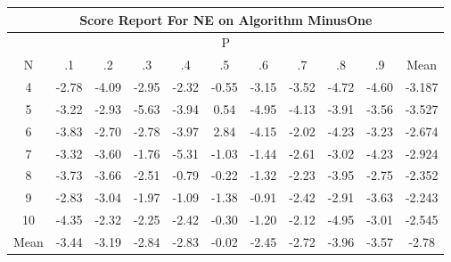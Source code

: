 \documentclass[11pt,a4paper]{report}
\begin{document}
\begin{longtable}{ | c || c | c | c | c | c | c | c | c | c || c |}
\hline
\multicolumn{11}{|c|}{ Score Report For NE on Algorithm MinusOne} \\
\hline
\multicolumn{11}{|c|}{ P } \\
\hline
N & .1 & .2 & .3 & .4 & .5 & .6 & .7 & .8 & .9 & Mean\\
 \hline
 \hline
 \endhead
  4 &  \cellcolor[HTML]{FFB7B7} -2.78 &  \cellcolor[HTML]{FF9797} -4.09 &  \cellcolor[HTML]{FFB7B7} -2.95 &  \cellcolor[HTML]{FFC7C7} -2.32 &  \cellcolor[HTML]{FFEFEF} -0.55 &  \cellcolor[HTML]{FFAFAF} -3.15 &  \cellcolor[HTML]{FFA7A7} -3.52 &  \cellcolor[HTML]{FF8787} -4.72 &  \cellcolor[HTML]{FF8F8F} -4.60 & -3.187 \\
  5 &  \cellcolor[HTML]{FFAFAF} -3.22 &  \cellcolor[HTML]{FFB7B7} -2.93 &  \cellcolor[HTML]{FF7070} -5.63 &  \cellcolor[HTML]{FF9F9F} -3.94 &  \cellcolor[HTML]{EFEFFF} 0.54 &  \cellcolor[HTML]{FF8080} -4.95 &  \cellcolor[HTML]{FF9797} -4.13 &  \cellcolor[HTML]{FF9F9F} -3.91 &  \cellcolor[HTML]{FFA7A7} -3.56 & -3.527 \\
  6 &  \cellcolor[HTML]{FF9F9F} -3.83 &  \cellcolor[HTML]{FFB7B7} -2.70 &  \cellcolor[HTML]{FFB7B7} -2.78 &  \cellcolor[HTML]{FF9F9F} -3.97 &  \cellcolor[HTML]{B7B7FF} 2.84 &  \cellcolor[HTML]{FF9797} -4.15 &  \cellcolor[HTML]{FFCFCF} -2.02 &  \cellcolor[HTML]{FF9797} -4.23 &  \cellcolor[HTML]{FFAFAF} -3.23 & -2.674 \\
  7 &  \cellcolor[HTML]{FFAFAF} -3.32 &  \cellcolor[HTML]{FFA7A7} -3.60 &  \cellcolor[HTML]{FFCFCF} -1.76 &  \cellcolor[HTML]{FF7878} -5.31 &  \cellcolor[HTML]{FFE7E7} -1.03 &  \cellcolor[HTML]{FFD7D7} -1.44 &  \cellcolor[HTML]{FFBFBF} -2.61 &  \cellcolor[HTML]{FFAFAF} -3.02 &  \cellcolor[HTML]{FF9797} -4.23 & -2.924 \\
  8 &  \cellcolor[HTML]{FF9F9F} -3.73 &  \cellcolor[HTML]{FF9F9F} -3.66 &  \cellcolor[HTML]{FFBFBF} -2.51 &  \cellcolor[HTML]{FFEFEF} -0.79 &  \cellcolor[HTML]{FFF7F7} -0.22 &  \cellcolor[HTML]{FFDFDF} -1.32 &  \cellcolor[HTML]{FFC7C7} -2.23 &  \cellcolor[HTML]{FF9F9F} -3.95 &  \cellcolor[HTML]{FFB7B7} -2.75 & -2.352 \\
  9 &  \cellcolor[HTML]{FFB7B7} -2.83 &  \cellcolor[HTML]{FFAFAF} -3.04 &  \cellcolor[HTML]{FFCFCF} -1.97 &  \cellcolor[HTML]{FFE7E7} -1.09 &  \cellcolor[HTML]{FFDFDF} -1.38 &  \cellcolor[HTML]{FFE7E7} -0.91 &  \cellcolor[HTML]{FFBFBF} -2.42 &  \cellcolor[HTML]{FFB7B7} -2.91 &  \cellcolor[HTML]{FFA7A7} -3.63 & -2.243 \\
  10 &  \cellcolor[HTML]{FF8F8F} -4.35 &  \cellcolor[HTML]{FFC7C7} -2.32 &  \cellcolor[HTML]{FFC7C7} -2.25 &  \cellcolor[HTML]{FFBFBF} -2.42 &  \cellcolor[HTML]{FFF7F7} -0.30 &  \cellcolor[HTML]{FFDFDF} -1.20 &  \cellcolor[HTML]{FFC7C7} -2.12 &  \cellcolor[HTML]{FF8080} -4.95 &  \cellcolor[HTML]{FFB7B7} -3.01 & -2.545 \\
 \hline
 \hline
Mean &  \cellcolor[HTML]{FFA7A7} -3.44 &  \cellcolor[HTML]{FFAFAF} -3.19 &  \cellcolor[HTML]{FFB7B7} -2.84 &  \cellcolor[HTML]{FFB7B7} -2.83 &  \cellcolor[HTML]{FFFFFF} -0.02 &  \cellcolor[HTML]{FFBFBF} -2.45 &  \cellcolor[HTML]{FFB7B7} -2.72 &  \cellcolor[HTML]{FF9F9F} -3.96 &  \cellcolor[HTML]{FFA7A7} -3.57 &  \cellcolor[HTML]{FFB7B7} -2.78
\end{longtable}
\end{document}
